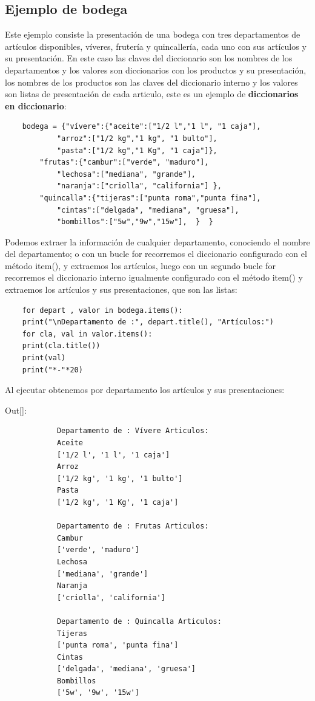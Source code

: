 \subsection{Ejemplo de bodega}

Este ejemplo consiste la presentación de una bodega con tres departamentos de artículos disponibles, víveres, frutería y quincallería, cada uno con sus artículos y su presentación.  
En este caso las claves del diccionario son los nombres de los departamentos y los valores son diccionarios con los productos y su presentación, los nombres de los  productos son las claves del diccionario interno y los valores son listas de presentación de cada articulo, este es un ejemplo de {\bf diccionarios en diccionario}:

\begin{lstlisting}
	bodega = {"vívere":{"aceite":["1/2 l","1 l", "1 caja"],
			"arroz":["1/2 kg","1 kg", "1 bulto"],
			"pasta":["1/2 kg","1 Kg", "1 caja"]}, 
		"frutas":{"cambur":["verde", "maduro"],
			"lechosa":["mediana", "grande"],
			"naranja":["criolla", "california"] },
		"quincalla":{"tijeras":["punta roma","punta fina"],
			"cintas":["delgada", "mediana", "gruesa"],
			"bombillos":["5w","9w","15w"],  }  }
\end{lstlisting}

Podemos extraer la información de cualquier departamento, conociendo el nombre del departamento;  o con un bucle  {\ttfamily for} recorremos el diccionario configurado con el método {\ttfamily item()}, y extraemos los artículos, luego con un segundo bucle {\ttfamily for} recorremos el diccionario interno igualmente configurado con el método {\ttfamily item()} y  extraemos los artículos y sus  presentaciones, que son las listas:

\hspace{-2.5cm}{\ttfamily \scriptsize bodega.py}  \vspace{-0.5cm}
\begin{lstlisting}
	for depart , valor in bodega.items():
	print("\nDepartamento de :", depart.title(), "Artículos:")
	for cla, val in valor.items():
	print(cla.title())
	print(val)
	print("*-"*20)    
\end{lstlisting}
Al ejecutar obtenemos por departamento los artículos y sus presentaciones:

{\ttfamily\scriptsize\scriptsize \noindent Out[]: \vspace{-0.3cm}	
	{\color{blue} 	
		\begin{verbatim}
			Departamento de : Vívere Articulos:
			Aceite
			['1/2 l', '1 l', '1 caja']
			Arroz
			['1/2 kg', '1 kg', '1 bulto']
			Pasta
			['1/2 kg', '1 Kg', '1 caja']
			
			Departamento de : Frutas Articulos:
			Cambur
			['verde', 'maduro']
			Lechosa
			['mediana', 'grande']
			Naranja
			['criolla', 'california']
			
			Departamento de : Quincalla Articulos:
			Tijeras
			['punta roma', 'punta fina']
			Cintas
			['delgada', 'mediana', 'gruesa']
			Bombillos
			['5w', '9w', '15w']
		\end{verbatim}
}}



